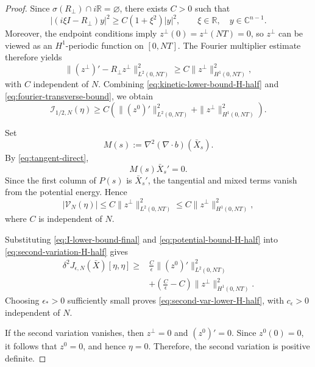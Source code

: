 \documentclass[preprint,12pt]{elsarticle}
\theoremstyle{definition}
\theoremstyle{plain}
\begin{document}
\begin{proof}
Since $\sigma(R_\perp)\cap i\mathbb R=\varnothing$, there exists
$C>0$ such that
\begin{equation*}
    |(i\xi I-R_\perp)y|^2
    \geq
    C(1+\xi^2)|y|^2,
    \qquad
    \xi\in\mathbb R,\quad
    y\in\mathbb C^{n-1}.
\end{equation*}
Moreover, the endpoint conditions imply
$z^\perp(0)=z^\perp(NT)=0$, so $z^\perp$ can be viewed as an
$H^1$-periodic function on $[0,NT]$. The Fourier multiplier estimate
therefore yields
\begin{equation}
\label{eq:fourier-transverse-bound}
    \|(z^\perp)'-R_\perp z^\perp\|_{L^2(0,NT)}^2
    \geq
    C\|z^\perp\|_{H^1(0,NT)}^2,
\end{equation}
with $C$ independent of $N$. Combining
\eqref{eq:kinetic-lower-bound-H-half} and
\eqref{eq:fourier-transverse-bound}, we obtain
\begin{equation}
\label{eq:I-lower-bound-final}
    \mathcal I_{1/2,N}(\eta)
    \geq
    C
    \left(
        \|(z^0)'\|_{L^2(0,NT)}^2
        +
        \|z^\perp\|_{H^1(0,NT)}^2
    \right).
\end{equation}

Set
\begin{equation*}
    M(s)
    :=
    \nabla^2(\nabla\!\cdot b)(\bar X_s).
\end{equation*}
By \eqref{eq:tangent-direct},
\begin{equation*}
    M(s)\bar X_s'=0.
\end{equation*}
Since the first column of $P(s)$ is $\bar X_s'$, the tangential and
mixed terms vanish from the potential energy. Hence
\begin{equation}
\label{eq:potential-bound-H-half}
    |\mathcal V_N(\eta)|
    \leq
    C\|z^\perp\|_{L^2(0,NT)}^2
    \leq
    C\|z^\perp\|_{H^1(0,NT)}^2,
\end{equation}
where $C$ is independent of $N$.

Substituting \eqref{eq:I-lower-bound-final} and
\eqref{eq:potential-bound-H-half} into
\eqref{eq:second-variation-H-half} gives
\begin{align*}
    \delta^2J_{\epsilon,N}(\bar X)[\eta,\eta]
    \geq{}&
    \frac{C}{\epsilon}
    \|(z^0)'\|_{L^2(0,NT)}^2
    \\
    &+
    \left(
        \frac{C}{\epsilon}-C
    \right)
    \|z^\perp\|_{H^1(0,NT)}^2.
\end{align*}
Choosing $\epsilon_*>0$ sufficiently small proves
\eqref{eq:second-var-lower-H-half}, with $c_\epsilon>0$ independent of
$N$.

If the second variation vanishes, then
$z^\perp=0$ and $(z^0)'=0$. Since $z^0(0)=0$, it follows that
$z^0=0$, and hence $\eta=0$. Therefore, the second variation is
positive definite.
\end{proof}
\end{document}
